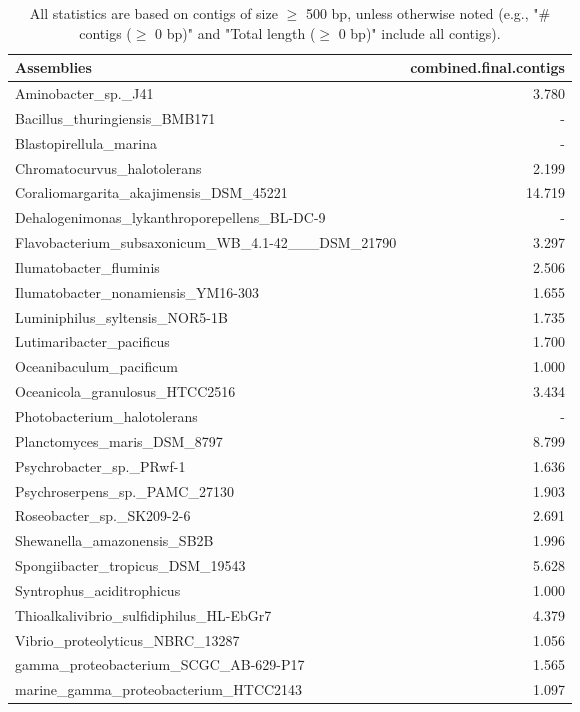 \documentclass[12pt,a4paper]{article}
\begin{document}
\begin{table}[ht]
\begin{center}
\caption{All statistics are based on contigs of size $\geq$ 500 bp, unless otherwise noted (e.g., "\# contigs ($\geq$ 0 bp)" and "Total length ($\geq$ 0 bp)" include all contigs).}
\begin{tabular}{|l*{1}{|r}|}
\hline
Assemblies & combined.final.contigs \\ \hline
Aminobacter\_sp.\_J41 & 3.780 \\ \hline
Bacillus\_thuringiensis\_BMB171 & - \\ \hline
Blastopirellula\_marina & - \\ \hline
Chromatocurvus\_halotolerans & 2.199 \\ \hline
Coraliomargarita\_akajimensis\_DSM\_45221 & 14.719 \\ \hline
Dehalogenimonas\_lykanthroporepellens\_BL-DC-9 & - \\ \hline
Flavobacterium\_subsaxonicum\_WB\_4.1-42\_\_\_DSM\_21790 & 3.297 \\ \hline
Ilumatobacter\_fluminis & 2.506 \\ \hline
Ilumatobacter\_nonamiensis\_YM16-303 & 1.655 \\ \hline
Luminiphilus\_syltensis\_NOR5-1B & 1.735 \\ \hline
Lutimaribacter\_pacificus & 1.700 \\ \hline
Oceanibaculum\_pacificum & 1.000 \\ \hline
Oceanicola\_granulosus\_HTCC2516 & 3.434 \\ \hline
Photobacterium\_halotolerans & - \\ \hline
Planctomyces\_maris\_DSM\_8797 & 8.799 \\ \hline
Psychrobacter\_sp.\_PRwf-1 & 1.636 \\ \hline
Psychroserpens\_sp.\_PAMC\_27130 & 1.903 \\ \hline
Roseobacter\_sp.\_SK209-2-6 & 2.691 \\ \hline
Shewanella\_amazonensis\_SB2B & 1.996 \\ \hline
Spongiibacter\_tropicus\_DSM\_19543 & 5.628 \\ \hline
Syntrophus\_aciditrophicus & 1.000 \\ \hline
Thioalkalivibrio\_sulfidiphilus\_HL-EbGr7 & 4.379 \\ \hline
Vibrio\_proteolyticus\_NBRC\_13287 & 1.056 \\ \hline
gamma\_proteobacterium\_SCGC\_AB-629-P17 & 1.565 \\ \hline
marine\_gamma\_proteobacterium\_HTCC2143 & 1.097 \\ \hline
\end{tabular}
\end{center}
\end{table}
\end{document}
